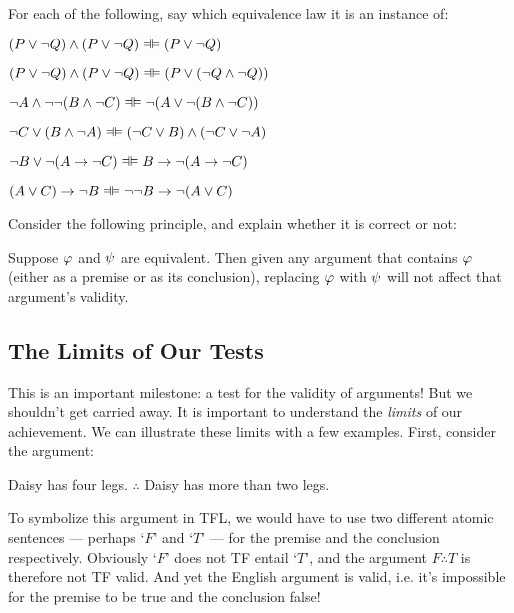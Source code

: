 \noindent For each of the following, say which equivalence law it is an instance of:

\begin{earg}
\item $(P \eor \enot Q) \land (P \eor \enot Q) \lequiv (P \lor \lnot Q)$
\item $(P \eor \enot Q) \land (P \eor \enot Q) \lequiv (P \lor (\lnot Q \land \lnot Q))$
\item $\lnot A \land \lnot \lnot (B \land \lnot C) \lequiv \enot(A \eor \enot (B \eand  \enot C))$ 
\item $\enot C \eor (B \eand  \enot A) \lequiv (\lnot C \lor B) \land (\lnot C \lor \lnot A)$
\item $\enot B \eor \enot (A \eif \enot C) \lequiv B \rightarrow \lnot (A \rightarrow \lnot C)$
\item $(A \eor C) \eif \enot B \lequiv \lnot \lnot B \rightarrow \lnot (A \lor C)$

\end{earg}



\problempart
Consider the following principle, and explain whether it is correct or not:
	\begin{ebullet}
		\item Suppose $\mathcal{\varphi}$ and $\mathcal{\psi}$ are equivalent. Then given any argument that contains $\mathcal{\varphi}$ (either as a premise or as its conclusion), replacing $\mathcal{\varphi}$ with $\mathcal{\psi}$  will not affect that argument's validity.
	\end{ebullet}


\subsection{The Limits of Our Tests}\label{s:TFTestLimits}

This is an important milestone: a test for the validity of arguments! But we shouldn't get carried away.  It is important to understand the \emph{limits} of our achievement. We can illustrate these limits with a few examples.  First, consider the argument:
	\begin{earg}
	\setcounter{eargnum}{0}
		\item Daisy has four legs. $\therefore$ Daisy has more than two legs.
	\end{earg}
To symbolize this argument in TFL, we would have to use two different atomic sentences --- perhaps `$F$'  and `$T$' --- for the premise and the conclusion respectively. Obviously `$F$' does not TF entail `$T$', and the argument $F \therefore T$ is therefore not TF valid.  And yet the English argument is valid, i.e. it's impossible for the premise to be true and the conclusion false!


